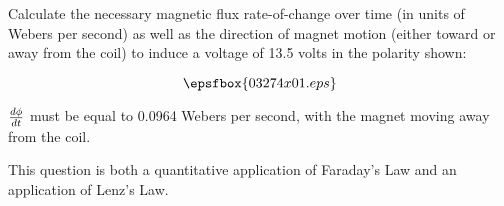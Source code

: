 

Calculate the necessary magnetic flux rate-of-change over time (in units of Webers per second) as well as the direction of magnet motion (either toward or away from the coil) to induce a voltage of 13.5 volts in the polarity shown:

$$\epsfbox{03274x01.eps}$$







$d \phi \over dt$ must be equal to 0.0964 Webers per second, with the magnet moving away from the coil.







This question is both a quantitative application of Faraday's Law and an application of Lenz's Law.




